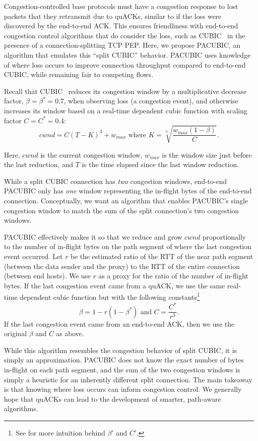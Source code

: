 Congestion-controlled base protocols must have a congestion response to lost
packets that they retransmit due to quACKs, similar to if the loss were
discovered by the end-to-end ACK.
This ensures friendliness with end-to-end congestion control algorithms that do
consider the loss, such as CUBIC~\cite{ha2008cubic} in the presence of a
connection-splitting TCP PEP.
Here, we propose PACUBIC, an algorithm that emulates this ``split CUBIC''
behavior. PACUBIC uses knowledge of where loss occurs to improve connection
throughput compared to end-to-end CUBIC, while remaining fair to competing flows.

Recall that CUBIC~\cite{ha2008cubic} reduces its congestion window by a
multiplicative decrease factor,
$\beta = \beta^* = 0.7$, when observing loss (a congestion event), and otherwise increases
its window based on a real-time dependent cubic function with scaling factor
$C=C^*=0.4$:
\[
cwnd = C(T-K)^3 + w_{max} \text{ where } K = \sqrt[3]{\frac{w_{max}(1-\beta)}{C}}.
\]

\noindent Here, $cwnd$ is the current congestion window,
$w_{max}$ is the window size just before the last reduction,
and $T$ is the time elapsed since the last window reduction.

While a split CUBIC connection has \emph{two} congestion windows,
end-to-end PACUBIC only has \emph{one} window representing the in-flight bytes
of the end-to-end connection.
Conceptually, we want an algorithm that enables PACUBIC's single
congestion window to match the sum of the split connection's two congestion
windows.

PACUBIC effectively makes it so that we reduce and grow $cwnd$
proportionally to the number of in-flight bytes on the path segment
of where the last congestion event occurred.
Let $r$ be the estimated ratio of the RTT of the near path segment
(between the data sender and the proxy) to the RTT of the entire connection
(between end hosts).
We use $r$ as a proxy for the ratio of the number of in-flight bytes.
If the last congestion event came from a quACK, we use the same real-time
dependent cubic function but with the following
constants\footnote{See  for more intuition behind $\beta'$ and $C'$.}
\[
\beta = 1 - r(1-\beta^*)\text{ and }C = \frac{C^*}{r^3}.
\]
\noindent If the last congestion event came from an end-to-end ACK, then we use
the original $\beta$ and $C$ as above.

While this algorithm resembles the congestion behavior of split CUBIC, it is
simply an approximation. PACUBIC does not know the exact number of bytes
in-flight on each path segment, and the sum of the two congestion windows is simply a
heuristic for an inherently different split connection. The main takeaway is
that knowing where loss occurs can inform congestion control. We generally
hope that quACKs can lead to the development of smarter, path-aware algorithms.

